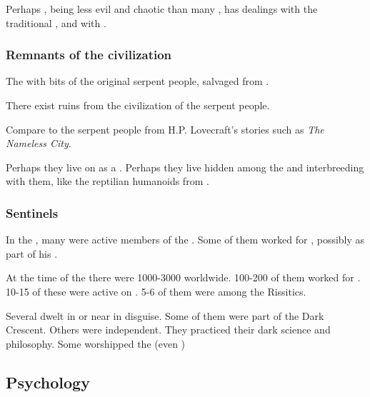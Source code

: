 Perhaps \Ishnaruchaefir, being less evil and chaotic than many \dragons, has dealings with the traditional \ophidians{}, and with \Mystraacht.  





\subsubsection{Remnants of the \ophidian{} civilization}
The \scathae{}  with bits of the original serpent people, salvaged from . 

There exist ruins from the civilization of the serpent people. 

Compare to the serpent people from H.P. Lovecraft's stories such as \emph{The Nameless City}.

Perhaps they live on as a . Perhaps they live hidden among the \scathae{} and interbreeding with them, like the reptilian humanoids from \DIBiggestSecret. 





\subsubsection{Sentinels}
In the , many \quiljaaran were active members of the . 
Some of them worked for , possibly as part of his . 

At the time of the \thirdbanewar there were 1000-3000 \quiljaaran worldwide. 
100-200 of them worked for \Secherdamon.
10-15 of these were active on \Azmith.
5-6 of them were among the Rissitics. 

Several \quiljaaran dwelt in or near \Yormis in disguise. 
Some of them were part of the Dark Crescent.
Others were independent.
They practiced their dark science and philosophy. 
Some worshipped the \xs (even \Ubloth) 









\subsection{Psychology}






